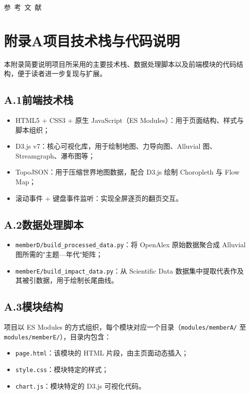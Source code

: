 \documentclass[UTF8]{CjC}
\theoremstyle{mystyle}
\begin{document}
\vspace{5mm}
\centerline
{\textsf{参~考~文~献}}
 \addtolength{\itemsep}{-1em}
\vspace {1.5mm}




\newpage
\vspace {10mm}


{\setlength\parindent{2em}
\section*{附录A\quad 项目技术栈与代码说明}



\noindent 本附录简要说明项目所采用的主要技术栈、数据处理脚本以及前端模块的代码结构，便于读者进一步复现与扩展。

\subsection*{A.1\quad 前端技术栈}
\begin{itemize}
    \item HTML5 + CSS3 + 原生 JavaScript（ES Modules）：用于页面结构、样式与脚本组织；
    \item D3.js v7：核心可视化库，用于绘制地图、力导向图、Alluvial 图、Streamgraph、瀑布图等；
    \item TopoJSON：用于压缩世界地图数据，配合 D3.js 绘制 Choropleth 与 Flow Map；
    \item 滚动事件 + 键盘事件监听：实现全屏逐页的翻页交互。
\end{itemize}

\subsection*{A.2\quad 数据处理脚本}
\begin{itemize}
    \item \texttt{memberD/build\_processed\_data.py}：将 OpenAlex 原始数据聚合成 Alluvial 图所需的"主题—年代"矩阵；
    \item \texttt{memberE/build\_impact\_data.py}：从 Scientific Data 数据集中提取代表作及其被引数据，用于绘制长尾曲线。
\end{itemize}

\subsection*{A.3\quad 模块结构}
项目以 ES Modules 的方式组织，每个模块对应一个目录（\texttt{modules/memberA/} 至 \texttt{modules/memberE/}），目录内包含：
\begin{itemize}
    \item \texttt{page.html}：该模块的 HTML 片段，由主页面动态插入；
    \item \texttt{style.css}：模块特定的样式；
    \item \texttt{chart.js}：模块特定的 D3.js 可视化代码。
\end{itemize}

}
\end{document}
